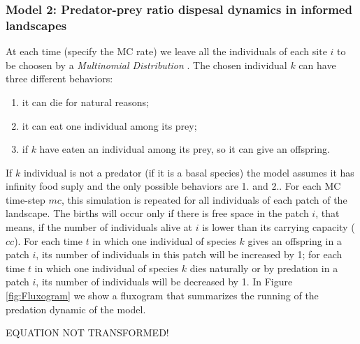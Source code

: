 \subsubsection{Model 2: Predator-prey ratio dispesal dynamics in informed landscapes}

At each time (specify the MC rate) we leave all the individuals of
each site $i$ to be choosen by a \emph{Multinomial Distribution}
\cite{levin1981representation}. The chosen individual $k$ can have
three different behaviors:
\begin{enumerate}
\item it can die for natural reasons;
\item it can eat one individual among its prey; 
\item if $k$ have eaten an individual among its prey, so it can give an offspring. 
\end{enumerate}
If $k$ individual is not a predator (if it is a basal species) the
model assumes it has infinity food suply and the only possible
behaviors are 1. and 2.. For each MC time-step $mc$, this simulation
is repeated for all individuals of each patch of the landscape. The
births will occur only if there is free space in the patch $i$, that
means, if the number of individuals alive at $i$ is lower than its
carrying capacity ($cc$). For each time $t$ in which one individual of
species $k$ gives an offspring in a patch $i$, its number of
individuals in this patch will be increased by 1; for each time $t$ in
which one individual of species $k$ dies naturally or by predation in
a patch $i$, its number of individuals will be decreased by 1. In
Figure \ref{fig:Fluxogram} we show a fluxogram that summarizes the
running of the predation dynamic of the model.

EQUATION NOT TRANSFORMED!

%
%

